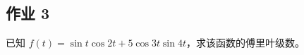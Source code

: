 \subsection{作业 3}

\begin{homework}
    已知 $f(t) = \sin t\cos 2t + 5\cos 3t \sin 4t$，求该函数的傅里叶级数。
\end{homework}
